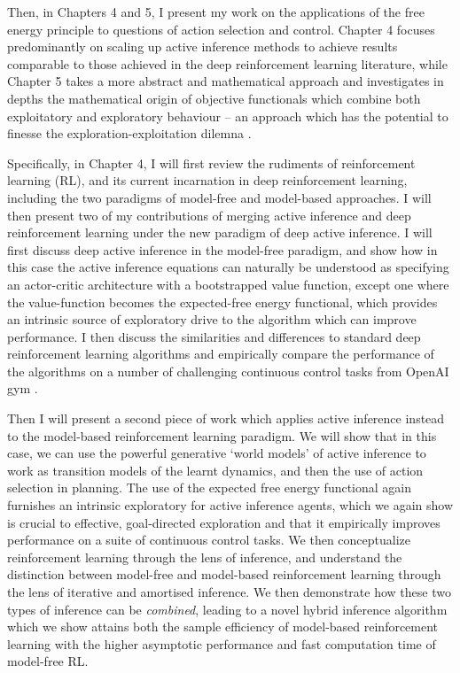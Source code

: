 Then, in Chapters 4 and 5, I present my work on the applications of the free energy principle to questions of action selection and control. Chapter 4 focuses predominantly on scaling up active inference methods to achieve results comparable to those achieved in the deep reinforcement learning literature, while Chapter 5 takes a more abstract and mathematical approach and investigates in depths the mathematical origin of objective functionals which combine both exploitatory and exploratory behaviour -- an approach which has the potential to finesse the exploration-exploitation dilemna \citep{friston2015active}.

Specifically, in Chapter 4, I will first review the rudiments of reinforcement learning (RL), and its current incarnation in deep reinforcement learning, including the two paradigms of model-free and model-based approaches. I will then present two of my contributions of merging active inference and deep reinforcement learning under the new paradigm of deep active inference. I will first discuss deep active inference in the model-free paradigm, and show how in this case the active inference equations can naturally be understood as specifying an actor-critic architecture with a bootstrapped value function, except one where the value-function becomes the expected-free energy functional, which provides an intrinsic source of exploratory drive to the algorithm which can improve performance. I then discuss the similarities and differences to standard deep reinforcement learning algorithms and empirically compare the performance of the algorithms on a number of challenging continuous control tasks from OpenAI gym \citep{brockman2016openai}. 

Then I will present a second piece of work which applies active inference instead to the model-based reinforcement learning paradigm. We will show that in this case, we can use the powerful generative `world models' \citep{ha_recurrent_2018} of active inference to work as transition models of the learnt dynamics, and then the use of action selection in planning. The use of the expected free energy functional again furnishes an intrinsic exploratory for active inference agents, which we again show is crucial to effective, goal-directed exploration and that it empirically improves performance on a suite of continuous control tasks. We then conceptualize reinforcement learning through the lens of inference, and understand the distinction between model-free and model-based reinforcement learning through the lens of iterative and amortised inference. We then demonstrate how these two types of inference can be \emph{combined}, leading to a novel hybrid inference algorithm which we show attains both the sample efficiency of model-based reinforcement learning with the higher asymptotic performance and fast computation time of model-free RL.

